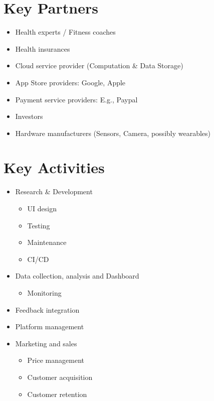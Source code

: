 \section{Key Partners}
\begin{itemize}
    \item Health experts / Fitness coaches
    \item Health insurances
    \item Cloud service provider (Computation \& Data Storage)
    \item App Store providers: Google, Apple
    \item Payment service providers: E.g., Paypal
    \item Investors
    \item Hardware manufacturers (Sensors, Camera, possibly wearables)
\end{itemize}

\section{Key Activities}
\begin{itemize}
    \item Research \& Development
        \begin{itemize}
            \item UI design
            \item Testing
            \item Maintenance
            \item CI/CD
        \end{itemize}
    \item Data collection, analysis and Dashboard
        \begin{itemize}
            \item Monitoring
        \end{itemize}
    \item Feedback integration
    \item Platform management
    \item Marketing and sales
        \begin{itemize}
            \item Price management
            \item Customer acquisition
            \item Customer retention
        \end{itemize}
\end{itemize}

